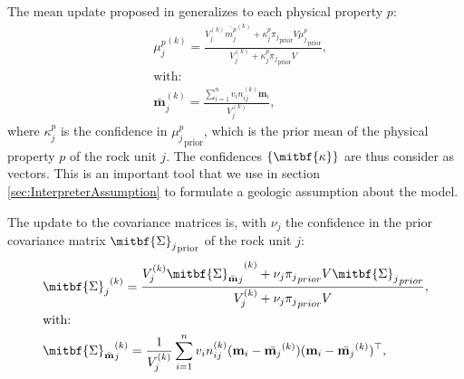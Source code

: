 \documentclass[extra, mreferee]{gji_joint} %
\begin{document}

The mean update proposed in \citet{ggz389} generalizes to each physical property $p$:
\begin{align}
&{\mu_j^p}^{(k)}=\frac{V_{j}^{(k)}{\bar{{m}^p_j}}^{(k)} + \kappa^p_j {\pi_j}_{\text{prior}} V {\mu^p_j}_{\text{prior}}}{V_{j}^{(k)}+\kappa_j^p {\pi_j}_{\text{prior}} V} \label{eq:mu_update},\\
&\text{with:} \nonumber\\
&{\bar{\mathbf{m}}}_j^{(k)} = \frac{\sum^n_{i=1} v_i n_{ij}^{(k)} \mathbf{m}_i}{V_{j}^{(k)}},
\end{align}
where $\kappa_j^p$ is the confidence in ${{\mu^p_j}_{\text{prior}}}$, which is the prior mean of the physical property $p$ of the rock unit $j$. The confidences $\{\mitbf{\kappa}\}$ are thus consider as vectors. This is an important tool that we use in section \ref{sec:InterpreterAssumption} to formulate a geologic assumption about the model.

The update to the covariance matrices is, with $\nu_j$ the confidence in the prior covariance matrix ${\mitbf{\Sigma}_j}_{\text{prior}}$ of the rock unit $j$:
\begin{align}
&{\mitbf{\Sigma}_j}^{(k)} = \frac{{{V_{j}^{(k)}} {\mitbf{\Sigma}_{\bar{\mathbf{m}}}}_j}^{(k)} + \nu_j {\pi_j}_{prior} V {\mitbf{\Sigma}_j}_{prior}}
{{V_{j}^{(k)}} + \nu_j {\pi_j}_{prior} V} \label{eq:sig_update},\\
&\text{with:} \nonumber\\
&{\mitbf{\Sigma}_{\bar{\mathbf{m}}}}_j^{(k)} =\frac{1}{{V_{j}^{(k)}}} \sum_{i=1}^{n} v_i n_{ij}^{(k)}(\mathbf{m}_i-\bar{\mathbf{m}_j}^{(k)})(\mathbf{m}_i-\bar{\mathbf{m}_j}^{(k)})^\top,
\end{align}

\end{document}
